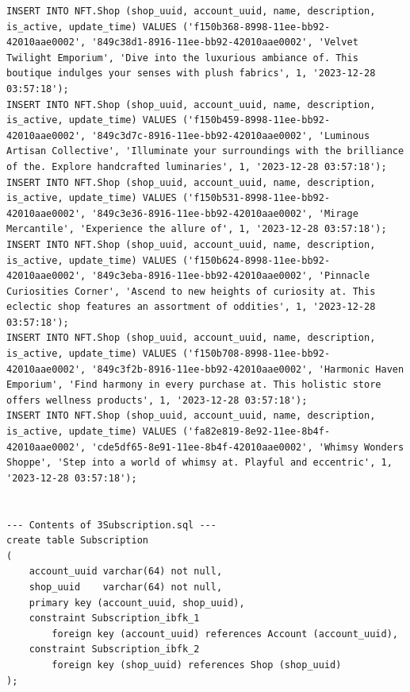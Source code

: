 \documentclass[a4paper, 12pt]{article}
\begin{document}
\begin{lstlisting}
INSERT INTO NFT.Shop (shop_uuid, account_uuid, name, description, is_active, update_time) VALUES ('f150b368-8998-11ee-bb92-42010aae0002', '849c38d1-8916-11ee-bb92-42010aae0002', 'Velvet Twilight Emporium', 'Dive into the luxurious ambiance of. This boutique indulges your senses with plush fabrics', 1, '2023-12-28 03:57:18');
INSERT INTO NFT.Shop (shop_uuid, account_uuid, name, description, is_active, update_time) VALUES ('f150b459-8998-11ee-bb92-42010aae0002', '849c3d7c-8916-11ee-bb92-42010aae0002', 'Luminous Artisan Collective', 'Illuminate your surroundings with the brilliance of the. Explore handcrafted luminaries', 1, '2023-12-28 03:57:18');
INSERT INTO NFT.Shop (shop_uuid, account_uuid, name, description, is_active, update_time) VALUES ('f150b531-8998-11ee-bb92-42010aae0002', '849c3e36-8916-11ee-bb92-42010aae0002', 'Mirage Mercantile', 'Experience the allure of', 1, '2023-12-28 03:57:18');
INSERT INTO NFT.Shop (shop_uuid, account_uuid, name, description, is_active, update_time) VALUES ('f150b624-8998-11ee-bb92-42010aae0002', '849c3eba-8916-11ee-bb92-42010aae0002', 'Pinnacle Curiosities Corner', 'Ascend to new heights of curiosity at. This eclectic shop features an assortment of oddities', 1, '2023-12-28 03:57:18');
INSERT INTO NFT.Shop (shop_uuid, account_uuid, name, description, is_active, update_time) VALUES ('f150b708-8998-11ee-bb92-42010aae0002', '849c3f2b-8916-11ee-bb92-42010aae0002', 'Harmonic Haven Emporium', 'Find harmony in every purchase at. This holistic store offers wellness products', 1, '2023-12-28 03:57:18');
INSERT INTO NFT.Shop (shop_uuid, account_uuid, name, description, is_active, update_time) VALUES ('fa82e819-8e92-11ee-8b4f-42010aae0002', 'cde5df65-8e91-11ee-8b4f-42010aae0002', 'Whimsy Wonders Shoppe', 'Step into a world of whimsy at. Playful and eccentric', 1, '2023-12-28 03:57:18');


--- Contents of 3Subscription.sql ---
create table Subscription
(
    account_uuid varchar(64) not null,
    shop_uuid    varchar(64) not null,
    primary key (account_uuid, shop_uuid),
    constraint Subscription_ibfk_1
        foreign key (account_uuid) references Account (account_uuid),
    constraint Subscription_ibfk_2
        foreign key (shop_uuid) references Shop (shop_uuid)
);


\end{lstlisting}
\end{document}
